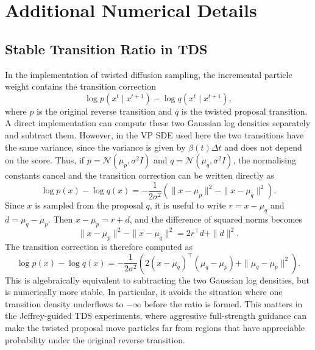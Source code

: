 \chapter{Additional Numerical Details}

\section{Stable Transition Ratio in TDS}

In the implementation of twisted diffusion sampling, the incremental particle weight contains the transition correction
\begin{equation*}
    \log p(x^t \mid x^{t+1}) - \log q(x^t \mid x^{t+1}),
\end{equation*}
where \(p\) is the original reverse transition and \(q\) is the twisted proposal transition. A direct implementation can compute these two Gaussian log densities separately and subtract them. However, in the VP SDE used here the two transitions have the same variance, since the variance is given by \(\beta(t)\Delta t\) and does not depend on the score. Thus, if \(p = \mathcal{N}(\mu_p, \sigma^2 I)\) and \(q = \mathcal{N}(\mu_q, \sigma^2 I)\), the normalising constants cancel and the transition correction can be written directly as
\begin{equation*}
    \log p(x) - \log q(x)
    =
    -\frac{1}{2\sigma^2}
    \left(
        \|x-\mu_p\|^2 - \|x-\mu_q\|^2
    \right).
\end{equation*}
Since \(x\) is sampled from the proposal \(q\), it is useful to write \(r = x-\mu_q\) and \(d = \mu_q-\mu_p\). Then \(x-\mu_p = r+d\), and the difference of squared norms becomes
\begin{equation*}
    \|x-\mu_p\|^2 - \|x-\mu_q\|^2
    =
    2r^\top d + \|d\|^2.
\end{equation*}
The transition correction is therefore computed as
\begin{equation*}
    \log p(x) - \log q(x)
    =
    -\frac{1}{2\sigma^2}
    \left(
        2(x-\mu_q)^\top(\mu_q-\mu_p)
        +
        \|\mu_q-\mu_p\|^2
    \right).
\end{equation*}
This is algebraically equivalent to subtracting the two Gaussian log densities, but is numerically more stable. In particular, it avoids the situation where one transition density underflows to \(-\infty\) before the ratio is formed. This matters in the Jeffrey-guided TDS experiments, where aggressive full-strength guidance can make the twisted proposal move particles far from regions that have appreciable probability under the original reverse transition.
